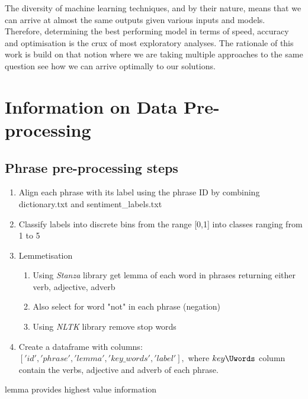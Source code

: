 \documentclass[10pt, a4paper]{article}
\begin{document}
The diversity of machine learning techniques, and by their nature, means that we can arrive at almost the same outputs given various inputs and models. Therefore, determining the best performing model in terms of speed, accuracy and optimisation is the crux of most exploratory analyses. The rationale of this work is build on that notion where we are taking multiple approaches to the same question see how we can arrive optimally to our solutions. 








\section{Information on Data Pre-processing}

\subsection{Phrase pre-processing steps}

\begin{enumerate} 
    \item Align each phrase with its label using the phrase ID by combining dictionary.txt and sentiment\_labels.txt
    \item Classify labels into discrete bins from the range [0,1] into classes ranging from 1 to 5
    \item Lemmetisation
    \begin{enumerate}
        \item Using \textit{Stanza} library get lemma of each word in phrases returning either verb, adjective, adverb
        \item Also select for word "not" in each phrase (negation)
        \item Using \textit{NLTK} library remove stop words 
    \end{enumerate}
    \item Create a dataframe with columns: $['id', 'phrase', 'lemma', 'key\_words', 'label'],$ where $key\Uwords$ column contain the verbs, adjective and adverb of each phrase.
\end{enumerate}
    
    lemma provides highest value information
    
\end{document}
